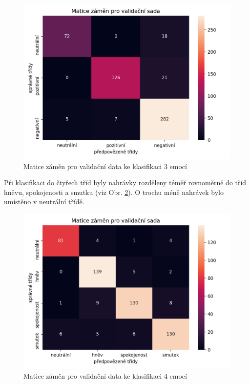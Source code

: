 \documentclass[FM,BP]{tulthesis}
\begin{document}
\begin{figure}[!htbp]
\centerline{\includegraphics[scale=.5]{3_emotions-conf_matrix-val.png}}
\caption{Matice záměn pro validační data ke klasifikaci 3 emocí}
\label{fig:3_emotions-conf_matrix-val}
\end{figure}
\FloatBarrier

Při klasifikaci do čtyřech tříd byly nahrávky rozděleny téměř rovnoměrně do tříd hněvu, spokojenosti a smutku (viz Obr. \ref{fig:4_emotions-conf_matrix-val}). O trochu méně nahrávek bylo umístěno v neutrální třídě.

\begin{figure}[!htbp]
\centerline{\includegraphics[scale=.5]{4_emotions-conf_matrix-val.png}}
\caption{Matice záměn pro validační data ke klasifikaci 4 emocí}
\label{fig:4_emotions-conf_matrix-val}
\end{figure}
\FloatBarrier
\end{document}
